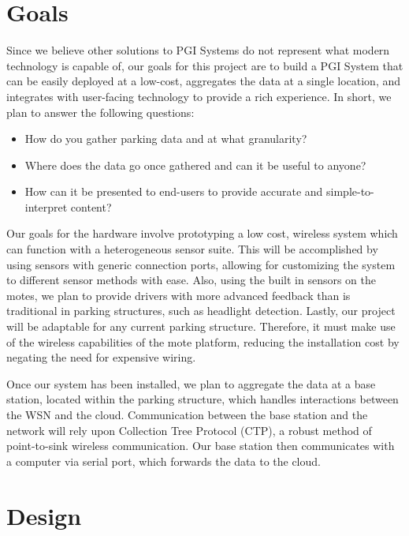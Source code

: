 \documentclass{acm_proc}
\begin{document}
\section{Goals}\label{sec:goals}

Since we believe other solutions to PGI Systems do not represent what
modern technology is capable of, our goals for this project are to build a
PGI System that can be easily deployed at a low-cost, aggregates the data
at a single location, and integrates with user-facing technology to provide
a rich experience.
In short, we plan to answer the following questions:
\begin{itemize}
	\item How do you gather parking data and at what granularity?
	\item Where does the data go once gathered and can it be useful to
	anyone?
	\item How can it be presented to end-users to provide accurate and
	simple-to-interpret content?
\end{itemize}

Our goals for the hardware involve prototyping a low cost, wireless system
which can function with a heterogeneous sensor suite.
This will be accomplished by using sensors with generic connection ports,
allowing for customizing the system to different sensor methods with ease.
Also, using
the built in sensors on the motes, we plan to provide drivers with more
advanced feedback than is traditional in parking structures, such as
headlight detection.
Lastly, our project will be adaptable for any current parking structure.
Therefore, it must make use of the wireless capabilities of the mote
platform, reducing the installation cost by negating the need for expensive
wiring.

Once our system has been installed, we plan to aggregate the data at a base
station, located within the parking structure, which handles interactions
between the WSN and the cloud.
Communication between the base station and the network will rely upon
Collection Tree Protocol (CTP), a robust method of point-to-sink wireless
communication.
Our base station then communicates with a computer via serial port, which
forwards the data to the cloud.

\section{Design}\label{sec:design}
\end{document}

